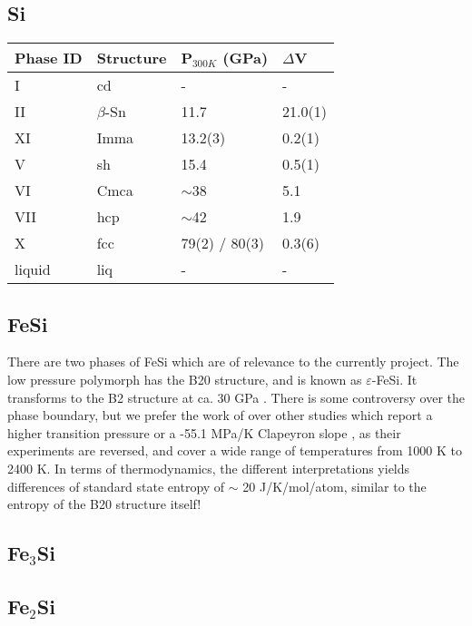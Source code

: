 \documentclass[11pt,a4paper,english]{article}
\begin{document}
\subsection{Si}
\begin{table}[h]
\begin{tabular}{llll}
Phase ID & Structure  & P$_{300 K}$ (GPa) & $\Delta$V \\
\hline
I        & cd         & -               & -          \\
II       & $\beta$-Sn & 11.7            & 21.0(1)    \\
XI       & Imma       & 13.2(3)         & 0.2(1)     \\
V        & sh         & 15.4            & 0.5(1)     \\
VI       & Cmca       & $\sim$38        & 5.1        \\
VII      & hcp        & $\sim$42        & 1.9        \\
X        & fcc        & 79(2) / 80(3)   & 0.3(6)     \\
liquid   & liq        & -               & -          \\
\end{tabular}
\end{table}



\subsection{FeSi}
There are two phases of FeSi which are of relevance to the currently project. The low pressure polymorph has the B20 structure, and is known as $\varepsilon$-FeSi. It transforms to the B2 structure at ca. 30 GPa \citep{GJ2014}. There is some controversy over the phase boundary, but we prefer the work of \cite{GJ2014} over other studies which report a higher transition pressure \citep{FCRMHDP2013} or a -55.1 MPa/K Clapeyron slope \citep{LWDACK2010}, as their experiments are reversed, and cover a wide range of temperatures from 1000 K to 2400 K. In terms of thermodynamics, the different interpretations yields differences of standard state entropy of $\sim$ 20 J/K/mol/atom, similar to the entropy of the B20 structure itself! 

\subsection{Fe$_3$Si}

\subsection{Fe$_2$Si} 
\end{document}
